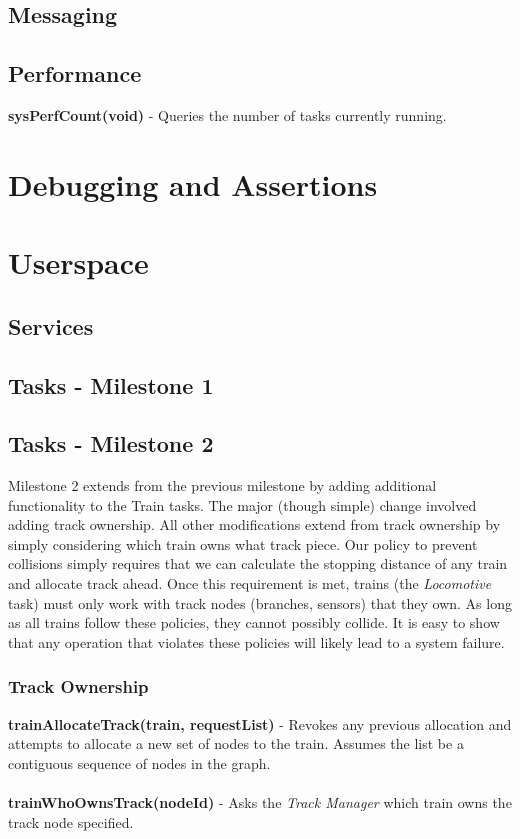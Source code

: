 \documentclass[twoside,a4paper]{refart}
\begin{document}
\subsection{Messaging}
\subsection{Performance}

\textbf{sysPerfCount(void)} - Queries the number of tasks currently running.

\section{Debugging and Assertions}

\section{Userspace}
\subsection{Services}
\subsection{Tasks - Milestone 1}
\subsection{Tasks - Milestone 2}
Milestone 2 extends from the previous milestone by adding additional functionality to the Train tasks. The major (though simple) change involved adding track ownership. All other modifications extend from track ownership by simply considering which train owns what track piece. Our policy to prevent collisions simply requires that we can calculate the stopping distance of any train and allocate track ahead. Once this requirement is met, trains (the \textit{Locomotive} task) must only work with track nodes (branches, sensors) that they own. As long as all trains follow these policies, they cannot possibly collide. It is easy to show that any operation that violates these policies will likely lead to a system failure.

\subsubsection{Track Ownership}

\textbf{trainAllocateTrack(train, requestList)} - Revokes any previous allocation and attempts to allocate a new set of nodes to the train. Assumes the list be a contiguous sequence of nodes in the graph. \\\\
\textbf{trainWhoOwnsTrack(nodeId)} - Asks the \textit{Track Manager} which train owns the track node specified. \\\\
\end{document}
